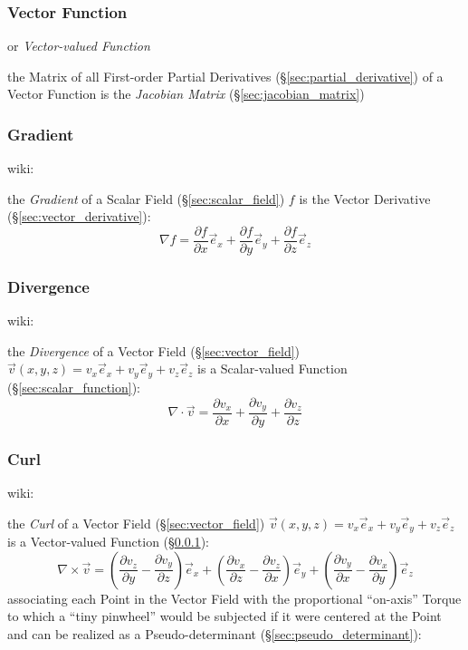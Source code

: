 


\subsubsection{Vector Function}\label{sec:vector_function}

or \emph{Vector-valued Function}

the Matrix of all First-order Partial Derivatives
(\S\ref{sec:partial_derivative}) of a Vector Function is the \emph{Jacobian
  Matrix} (\S\ref{sec:jacobian_matrix})



\subsubsection{Gradient}\label{sec:gradient}

wiki:

the \emph{Gradient} of a Scalar Field (\S\ref{sec:scalar_field}) $f$ is the
Vector Derivative (\S\ref{sec:vector_derivative}):
\[
  \nabla f =
    \frac{\partial f}{\partial x}\vec{e}_x +
    \frac{\partial f}{\partial y}\vec{e}_y +
    \frac{\partial f}{\partial z}\vec{e}_z
\]



\subsubsection{Divergence}\label{sec:divergence}

wiki:

the \emph{Divergence} of a Vector Field (\S\ref{sec:vector_field})
$\vec{v}(x,y,z) = v_x\vec{e}_x + v_y\vec{e}_y + v_z\vec{e}_z$ is a
Scalar-valued Function (\S\ref{sec:scalar_function}):
\[
  \nabla \cdot \vec{v} =
    \frac{\partial v_x}{\partial x} +
    \frac{\partial v_y}{\partial y} +
    \frac{\partial v_z}{\partial z}
\]



\subsubsection{Curl}\label{sec:curl}

wiki:

the \emph{Curl} of a Vector Field (\S\ref{sec:vector_field}) $\vec{v}(x,y,z) =
v_x\vec{e}_x + v_y\vec{e}_y + v_z\vec{e}_z$ is a Vector-valued Function
(\S\ref{sec:vector_function}):
\[
  \nabla\times\vec{v} =
    (\frac{\partial v_z}{\partial y}-\frac{\partial v_y}{\partial z})\vec{e}_x +
    (\frac{\partial v_x}{\partial z}-\frac{\partial v_z}{\partial x})\vec{e}_y +
    (\frac{\partial v_y}{\partial x}-\frac{\partial v_x}{\partial y})\vec{e}_z
\]
associating each Point in the Vector Field with the proportional ``on-axis''
Torque to which a ``tiny pinwheel'' would be subjected if it were centered at
the Point and can be realized as a Pseudo-determinant
(\S\ref{sec:pseudo_determinant}):

